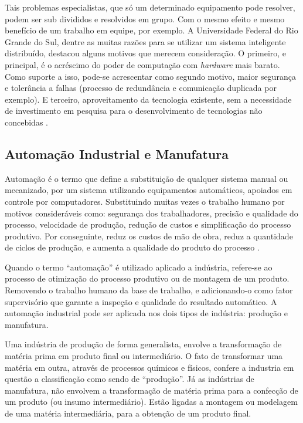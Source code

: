 \documentclass[
	article,			    %
	12pt,				    %
	oneside,			    %
	a4paper,			    %
	chapter=TITLE,		    %
	section=TITLE,		    %
	subsection=TITLE,	    %
	english,			    %
	brazil,				    %
	sumario=tradicional
]{abntex2}
\begin{document}
Tais problemas especialistas, que só um determinado equipamento pode resolver, podem ser sub divididos e resolvidos em grupo. Com o mesmo efeito e mesmo benefício de um trabalho em equipe, por exemplo. A Universidade Federal do Rio Grande do Sul, dentre as muitas razões para se utilizar um sistema inteligente distribuído, destacou alguns motivos que merecem consideração. O primeiro, e principal, é o acréscimo do poder de computação com \emph{hardware} mais barato. Como suporte a isso, pode-se acrescentar como segundo motivo, maior segurança e tolerância a falhas (processo de redundância e comunicação duplicada por exemplo). E terceiro, aproveitamento da tecnologia existente, sem a necessidade de investimento em pesquisa para o desenvolvimento de tecnologias não concebidas \cite{ufrgsiad}. 

\subsection{Automação Industrial e Manufatura}
Automação é o termo que define a substituição de qualquer sistema manual ou mecanizado, por um sistema utilizando equipamentos automáticos, apoiados em controle por computadores. Substituindo muitas vezes o trabalho humano por motivos consideráveis como: segurança dos trabalhadores, precisão e qualidade do processo, velocidade de produção, redução de custos e simplificação do processo produtivo. Por conseguinte, reduz os custos de mão de obra, reduz a quantidade de ciclos de produção, e aumenta a qualidade do produto do processo \cite{groover2011automacao}.

Quando o termo ``automação'' é utilizado aplicado a indústria, refere-se ao processo de otimização do processo produtivo ou de montagem de um produto. Removendo o trabalho humano da base de trabalho, e adicionando-o como fator supervisório que garante a inspeção e qualidade do resultado automático. A automação industrial pode ser aplicada nos dois tipos de indústria: produção e manufatura.

Uma indústria de produção de forma generalista, envolve a transformação de matéria prima em produto final ou intermediário. O fato de transformar uma matéria em outra, através de processos químicos e físicos, confere a industria em questão a classificação como sendo de ``produção''. Já as indústrias de manufatura, não envolvem a transformação de matéria prima para a confecção de um produto (ou insumo intermediário). Estão ligadas a montagem ou modelagem de uma matéria intermediária, para a obtenção de um produto final.
\end{document}
